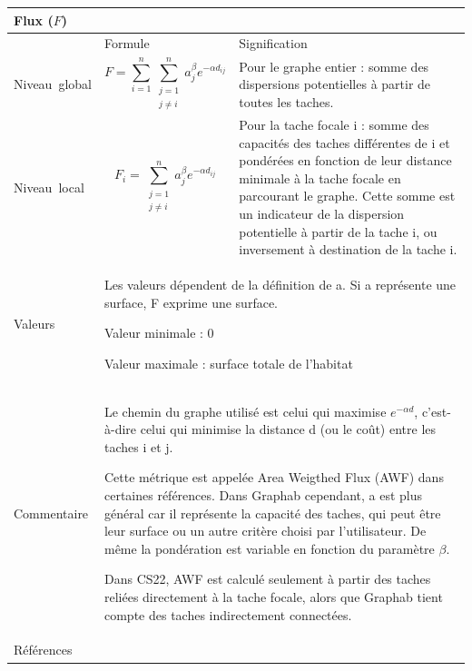 \documentclass{article}
\begin{document}
\begin{table}[H]
\begin{tabular}{|m{3.24cm}|m{4.4810004cm}m{7.924cm}|}

\hline
\multicolumn{3}{|m{16.044998cm}|}{Flux ($F$)}\\\hline
 &
\multicolumn{1}{m{4.4810004cm}|}{Formule} &
Signification\\\hline
Niveau~global &
\multicolumn{1}{m{4.4810004cm}|}{\begin{equation*}
F=\sum _{i=1}^{n}{\sum _{\begin{matrix}j=1\\j{\neq}i\end{matrix}}^{n}{{a}_{j}^{\beta }}}{e}^{-\alpha {d}_{\mathit{ij}}}
\end{equation*}
} &
Pour le graphe entier : somme des dispersions potentielles à partir de toutes les taches.\\\hline
Niveau~local &
\multicolumn{1}{m{4.4810004cm}|}{\begin{equation*}
{F}_{i}=\sum _{\begin{matrix}j=1\\j{\neq}i\end{matrix}}^{n}{{a}_{j}^{\beta }}{e}^{-\alpha {d}_{\mathit{ij}}}
\end{equation*}
} &
Pour la tache focale i : somme des capacités des taches différentes de i et pondérées en fonction de leur distance minimale à la tache focale en parcourant le graphe. Cette somme est un indicateur de la dispersion potentielle à partir de la tache i, ou inversement à destination de la tache i.

\\\hline
Valeurs &
\multicolumn{2}{m{12.6050005cm}|}{Les valeurs dépendent de la définition de a. Si a représente une surface, F exprime une surface.

Valeur minimale : 0

Valeur maximale : surface totale de l’habitat
}\\\hline
Commentaire &
\multicolumn{2}{m{12.6050005cm}|}{Le chemin du graphe utilisé est celui qui maximise  ${e}^{-\mathit{\alpha d}}$, c’est-à-dire celui qui minimise la distance d (ou le coût) entre les taches i et j.

Cette métrique est appelée Area Weigthed Flux (AWF) dans certaines références. Dans Graphab cependant, a est plus général car il représente la capacité des taches, qui peut être leur surface ou un autre critère choisi par l’utilisateur. De même la pondération est variable en fonction du paramètre $\beta $.

Dans CS22, AWF est calculé seulement à partir des taches reliées directement à la tache focale, alors que Graphab tient compte des taches indirectement connectées. 

}\\\hline
Références &
\multicolumn{2}{m{12.6050005cm}|}{
	\cite{Urban2001} \cite{Saura2009} \cite{2012_SDM}
}\\\hline
\end{tabular}
\end{table}
\end{document}
